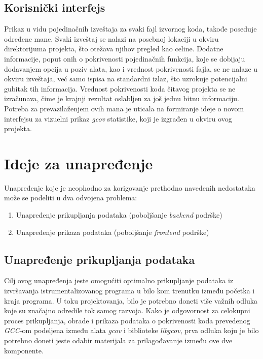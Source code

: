 \documentclass[12pt,oneside]{memoir}
\newcommand{\strano}[1]{\textit{#1}}
\begin{document}
\subsection{Korisnički interfejs}


Prikaz u vidu pojedinačnih izveštaja za svaki fajl izvornog koda, takođe poseduje određene mane. Svaki izveštaj se nalazi na posebnoj lokaciji u okviru direktorijuma projekta, što otežava njihov pregled kao celine. Dodatne informacije, poput onih o pokrivenosti pojedinačnih funkcija, koje se dobijaju dodavanjem opcija u poziv alata, kao i vrednost pokrivenosti fajla, se ne nalaze u okviru izveštaja, već samo ispisa na standardni izlaz, što uzrokuje potencijalni gubitak tih informacija. Vrednost pokrivenosti koda čitavog projekta se ne izračunava, čime je krajnji rezultat oslabljen za još jednu bitnu informaciju. Potreba za prevazilaženjem ovih mana je uticala na formiranje ideje o novom interfejsu za vizuelni prikaz \strano{gcov} statistike, koji je izgrađen u okviru ovog projekta. 


\section{Ideje za unapređenje}


Unapređenje koje je neophodno za korigovanje prethodno navedenih nedostataka može se podeliti u dva odvojena problema:
\begin{enumerate}
\item Unapređenje prikupljanja podataka (poboljšanje \strano{backend} podrške)
\item Unapređenje prikaza podataka (poboljšanje \strano{frontend} podrške)
\end{enumerate}


\subsection{Unapređenje prikupljanja podataka}

Cilj ovog unapređenja jeste omogućiti optimalno prikupljanje podataka iz izvršavanja istrumentalizovanog programa u bilo kom trenutku između početka i kraja programa. U toku projektovanja, bilo je potrebno doneti više važnih odluka koje su značajno odredile tok samog razvoja. Kako je odgovornost za celokupni proces prikupljanja, obrade i prikaza podataka o pokrivenosti koda prevedenog \strano{GCC}-om podeljena između alata \strano{gcov} i biblioteke \strano{libgcov}, prva odluka koju je bilo potrebno doneti jeste odabir materijala za prilagođavanje između ove dve komponente.
\end{document}
